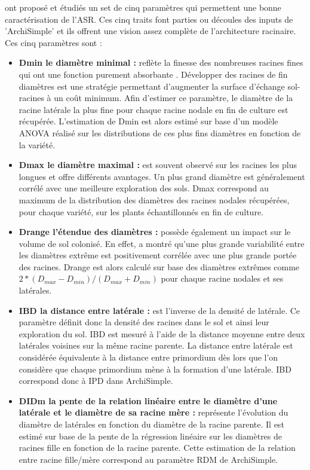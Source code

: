 \cite{pages_calibration_2014,wu_relationships_2016,pages_seeking_2018} ont proposé et étudiés un set de cinq paramètres qui permettent une bonne caractérisation de l'ASR.
Ces cinq traits font parties ou découles des inputs de 'ArchiSimple' et ils offrent une vision assez complète de l'architecture racinaire.
Ces cinq paramètres sont :
\begin{itemize}
    \item \textbf{Dmin le diamètre minimal : } reflète la finesse des nombreuses racines fines qui ont une fonction purement absorbante \citep{pages_seeking_2018}.
    Développer des racines de fin diamètres est une stratégie permettant d'augmenter la surface d'échange sol-racines à un coût minimum.
    Afin d'estimer ce paramètre, le diamètre de la racine latérale la plus fine pour chaque racine nodale en fin de culture est récupérée.
    L'estimation de Dmin est alors estimé sur base d'un modèle ANOVA réalisé sur les distributions de ces plus fins diamètres en fonction de la variété.
    \item \textbf{Dmax le diamètre maximal : } est souvent observé sur les racines les plus longues et offre différents avantages.
    Un plus grand diamètre est généralement corrélé avec une meilleure exploration des sols.
    Dmax correspond au maximum de la distribution des diamètres des racines nodales récupérées, pour chaque variété, sur les plants échantillonnés en fin de culture.
    \item \textbf{Drange l'étendue des diamètres :} possède également un impact sur le volume de sol colonisé.
    En effet, \cite{pages_links_2011} a montré qu'une plus grande variabilité entre les diamètres extrême est positivement corrélée avec une plus grande portée des racines.
    Drange est alors calculé sur base des diamètres extrêmes comme $2*(D_{max}-D_{min})/(D_{max}+D_{min})$ pour chaque racine nodales et ses latérales.
    \item \textbf{IBD la distance entre latérale : } est l'inverse de la densité de latérale.
    Ce paramètre définit donc la densité des racines dans le sol et ainsi leur exploration du sol.
    IBD est mesuré à l'aide de la distance moyenne entre deux latérales voisines sur la même racine parente.
    La distance entre latérale est considérée équivalente à la distance entre primordium dès lors que l'on considère que chaque primordium mène à la formation d'une latérale.
    IBD correspond donc à IPD dans ArchiSimple.
    \item \textbf{DIDm la pente de la relation linéaire entre le diamètre d'une latérale et le diamètre de sa racine mère : } représente l'évolution du diamètre de latérales en fonction du diamètre de la racine parente.
    Il est estimé sur base de la pente de la régression linéaire sur les diamètres de racines fille en fonction de la racine parente.
    Cette estimation de la relation entre racine fille/mère correspond au paramètre RDM de ArchiSimple. 
\end{itemize}

